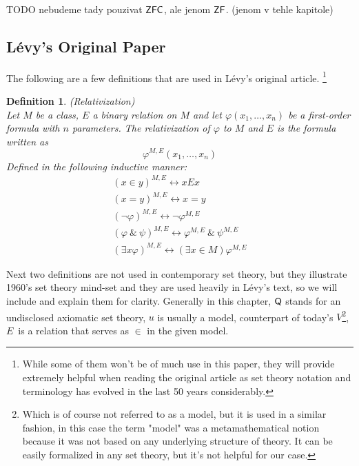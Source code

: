 \documentclass[12pt,a4paper]{article}
\newtheorem{definition}[theorem]{Definition}
\renewcommand{\iff}{\leftrightarrow}
\begin{document}
TODO nebudeme tady pouzivat $\sf{ZFC}$, ale jenom $\sf{ZF}$. (jenom v tehle kapitole)


\subsection{Lévy's Original Paper}\label{sec:Levy1960}

The following are a few definitions that are used in Lévy's original article. \footnote{While some of them won't be of much use in this paper, they will provide extremely helpful when reading the original article as set theory notation and terminology has evolved in the last 50 years considerably.}

\begin{definition}{(Relativization)}\label{def:relativization}\cite[Definition 12.6]{JechBook}\\ 
Let $M$ be a class, $E$ a binary relation on $M$ and let $\varphi(x_1, \ldots, x_n)$ be a first-order formula with $n$ parameters. The relativization of $\varphi$ to $M$ and $E$ is the formula written as
\begin{equation}
\varphi^{M, E}(x_1, \ldots, x_n)
\end{equation}
Defined in the following inductive manner:
\begin{equation}
\begin{gathered}
(x \in y)^{M,E} \iff x E x\\
(x = y)^{M,E} \iff x = y\\
(\neg \varphi)^{M,E} \iff \neg \varphi^{M,E}\\
(\varphi\ \&\ \psi)^{M,E} \iff \varphi^{M,E}\ \&\ \psi^{M,E}\\
(\exists x\varphi)^{M,E} \iff (\exists x \in M) \varphi^{M,E}
\end{gathered}
\end{equation}
\end{definition}

Next two definitions are not used in contemporary set theory, but they illustrate 1960's set theory mind-set and they are used heavily in Lévy's text, so we will include and explain them for clarity. Generally in this chapter, $\sf{Q}$ stands for an undisclosed axiomatic set theory, $u$ is usually a model, counterpart of today's $V$\footnote{Which is of course not referred to as a model, but it is used in a similar fashion, in this case the term "model" was a metamathematical notion because it was not based on any underlying structure of theory. It can be easily formalized in any set theory, but it's not helpful for our case.}, $E$ is a relation that serves as $\in$ in the given model.
\end{document}
